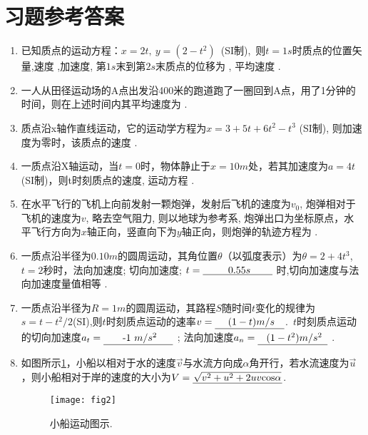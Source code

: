 \section{习题参考答案}
\begin{enumerate}
    \item 已知质点的运动方程：$x =2t,\ y =(2-t^2)$\ (SI制),\ 则$t=1s$时质点的位置矢量,速度 ,加速度, 第$1s$末到第$2s$末质点的位移为
    , 平均速度 .
    \item 一人从田径运动场的A点出发沿400米的跑道跑了一圈回到A点，用了1分钟的时间，则在上述时间内其平均速度为 .
    \item 质点沿x轴作直线运动，它的运动学方程为$x = 3+5t+6t^2-t^3$ (SI制), 则加速度为零时，该质点的速度 .
    \item 一质点沿X轴运动，当$t=0$时，物体静止于$x=10m$处，若其加速度为$a=4t$(SI制)，则t时刻质点的速度, 运动方程 .
    \item 在水平飞行的飞机上向前发射一颗炮弹，发射后飞机的速度为$v_0$, 炮弹相对于飞机的速度为$v$, 略去空气阻力, 则以地球为参考系, 炮弹出口为坐标原点，水平飞行方向为$x$轴正向，竖直向下为$y$轴正向，则炮弹的轨迹方程为  .
    \item 一质点沿半径为$0.10m$的圆周运动，其角位置$\theta$（以弧度表示）为$\theta=2+4t^3$,\ $t=2$秒时，法向加速度; 切向加速度; $t = \anl{$0.55 s$}$ 时,切向加速度与法向加速度量值相等 .
    \item 一质点沿半径为$R=1m$的圆周运动，其路程$S$随时间$t$变化的规律为$s=t-t^2/2$(SI),则$t$时刻质点运动的速率$v=\anl{$(1-t) m/s$}$.\ $t$时刻质点运动的切向加速度$a_t=\anl{-1 $m/s^2$}$ ; 法向加速度$a_n=\anl{$(1-t^2) m/s^2$}$ .
    \item 如图所示\ref{Fig:2}，小船以相对于水的速度$\vec{v}$与水流方向成$\alpha$角开行，若水流速度为$\vec{u}$，则小船相对于岸的速度的大小为$V=\underline{\makebox[9em]{$\sqrt{v^2+u^2+2uv\mathrm{cos}\alpha}$}}$.
    \begin{figure}[H]
        \centering
        \texttt{[image: fig2]}
        \caption{小船运动图示.}\label{Fig:2}
    \end{figure}
\end{enumerate}
